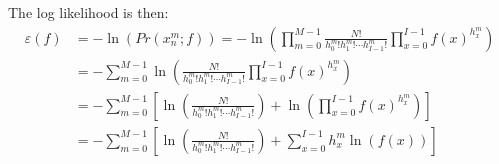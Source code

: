 \documentclass[11pt]{article}
\begin{document}
The log likelihood is then:
\begin{align}
   \varepsilon(f) &= -\ln(Pr(x^m_n; f)) = -\ln\left(\prod_{m=0}^{M-1}\frac{N!}{h^m_0! h^m_1! \cdots h^m_{I-1}!} \prod_{x=0}^{I-1} f(x)^{h^m_{x}}\right) \\
   &= -\sum_{m=0}^{M-1}\ln\left(\frac{N!}{h^m_0! h^m_1! \cdots h^m_{I-1}!} \prod_{x=0}^{I-1} f(x)^{h^m_{x}}\right) \\
   &= -\sum_{m=0}^{M-1}\left[\ln\left(\frac{N!}{h^m_0! h^m_1! \cdots h^m_{I-1}!}\right) +\ln\left(\prod_{x=0}^{I-1} f(x)^{h^m_{x}}\right) \right]\\
   &= -\sum_{m=0}^{M-1}\left[\ln\left(\frac{N!}{h^m_0! h^m_1! \cdots h^m_{I-1}!}\right) +\sum_{x=0}^{I-1} h^m_x \ln\left(f(x)\right) \right]\\
\end{align}
\end{document}
